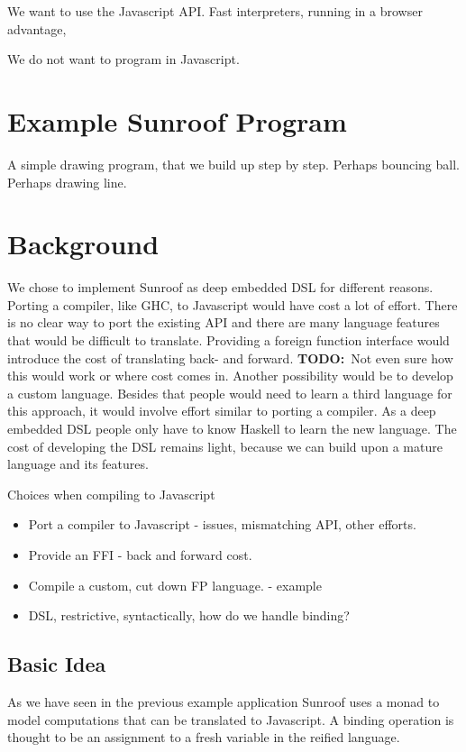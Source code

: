 \documentclass{llncs}
\newcommand{\TODO}[1]{{\textbf{TODO:}\ #1}}
\begin{document}
We want to use the Javascript API. Fast interpreters,
running in a browser advantage, 

We do not want to program in Javascript.

\section{Example Sunroof Program}

A simple drawing program, that we build up step by step.
Perhaps bouncing ball.
Perhaps drawing line.

\section{Background}

We chose to implement Sunroof as deep embedded DSL for different
reasons. Porting a compiler, like GHC, to Javascript would have
cost a lot of effort. There is no clear way to port the existing
API and there are many language features that would be difficult to
translate. Providing a foreign function interface would 
introduce the cost of translating back- and forward. 
\TODO{Not even sure how this would work or where cost comes in.}
Another possibility would be to develop a custom language. 
Besides that people would need to learn a third language for this 
approach, it would involve effort similar to porting a compiler.
As a deep embedded DSL people only have to know Haskell to learn
the new language. The cost of developing the DSL remains light, 
because we can build upon a mature language and its features.

Choices when compiling to Javascript
\begin{itemize}
\item Port a compiler to Javascript - issues, mismatching API, other efforts.
\item Provide an FFI - back and forward cost.
\item Compile a custom, cut down FP language. - example
\item DSL, restrictive, syntactically, how do we handle binding?
\end{itemize}

\subsection{Basic Idea}

As we have seen in the previous example application Sunroof uses a 
monad to model computations that can be translated to Javascript.
A binding operation is thought to be an assignment to 
a fresh variable in the reified language.
\end{document}
